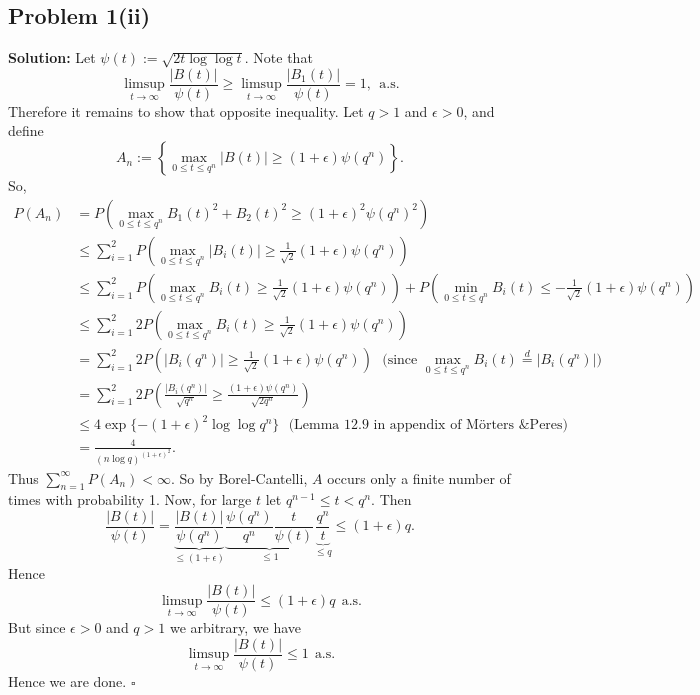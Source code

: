 \documentclass[12pt]{article}
\newcounter{ProofCounter}
\newenvironment{Solution}{\stepcounter{ProofCounter}\textbf{Solution:}}{\hfill$\square$}
\newcommand\toinf{\rightarrow\infty}
\begin{document}
\subsection*{Problem 1(ii)}
\begin{Solution}
  Let $\psi(t) := \sqrt{2t\log\log t}$. Note that
  \[
    \limsup_{t\rightarrow\infty} \frac{|B(t)|}{\psi(t)} \geq \limsup_{t\rightarrow\infty} \frac{|B_1(t)|}{\psi(t)} = 1, \ \ \text{a.s.}
  \]
  Therefore it remains to show that opposite inequality. Let $q > 1$ and $\epsilon > 0$, and define
  \[
    A_n := \left\{ \max_{0\leq t \leq q^n}|B(t)| \geq (1 + \epsilon) \psi(q^n) \right\}.
  \]
  So,
  \begin{align*}
    P(A_n) & = P \left( \max_{0\leq t \leq q^n} B_1(t)^2 + B_2(t)^2 \geq (1 + \epsilon)^2\psi(q^n)^2 \right) \\
    & \leq \sum_{i=1}^{2} P \left( \max_{0\leq t \leq q^n} |B_i(t)| \geq \frac{1}{\sqrt{2}}(1 + \epsilon)\psi(q^n) \right) \\
    & \leq \sum_{i=1}^{2} P \left( \max_{0\leq t \leq q^n} B_i(t) \geq \frac{1}{\sqrt{2}}(1 + \epsilon)\psi(q^n) \right) + P \left( \min_{0\leq t \leq q^n} B_i(t) \leq - \frac{1}{\sqrt{2}}(1 + \epsilon)\psi(q^n) \right) \\
    & \leq \sum_{i=1}^{2} 2 P \left( \max_{0\leq t \leq q^n} B_i(t) \geq \frac{1}{\sqrt{2}}(1 + \epsilon)\psi(q^n) \right) \\
  & = \sum_{i=1}^{2} 2 P \left( |B_i(q^n)| \geq \frac{1}{\sqrt{2}}(1 + \epsilon)\psi(q^n) \right) \ \ \ \text{(since $\max_{0\leq t \leq q^n}B_i(t) \stackrel{d}{=} |B_i(q^n)|$)} \\
    & = \sum_{i=1}^{2} 2 P \left( \frac{|B_i(q^n)|}{\sqrt{q^n}} \geq \frac{(1 + \epsilon)\psi(q^n)}{\sqrt{2q^n}} \right) \\
    & \leq 4 \exp\{ -(1 + \epsilon)^2 \log \log q^n \} \ \ \ \text{(Lemma 12.9 in appendix of M\"{o}rters \& Peres)} \\
    & = \frac{4}{(n\log q)^{(1+\epsilon)^2}}.
  \end{align*}
  Thus $\sum_{n=1}^{\infty} P(A_n) < \infty$. So by Borel-Cantelli, $A$ occurs only a finite number of times with probability 1. Now, for large $t$ let $q^{n-1} \leq t < q^{n}$. Then
  \[
    \frac{|B(t)|}{\psi(t)} = \underbrace{\frac{|B(t)|}{\psi(q^n)}}_{\leq (1 + \epsilon)} \underbrace{\frac{\psi(q^n)}{q^n} \frac{t}{\psi(t)}}_{\leq 1} \underbrace{\frac{q^n}{t}}_{\leq q} \leq (1 + \epsilon) q.
  \]
  Hence
  \[
    \limsup_{t \rightarrow \infty} \frac{|B(t)|}{\psi(t)} \leq (1 + \epsilon)q \ \ \text{a.s.}
  \]
  But since $\epsilon > 0$ and $q > 1$ we arbitrary, we have
  \[
    \limsup_{t\toinf} \frac{|B(t)|}{\psi(t)} \leq 1 \ \ \text{a.s.}
  \]
  Hence we are done.
\end{Solution}
\end{document}
